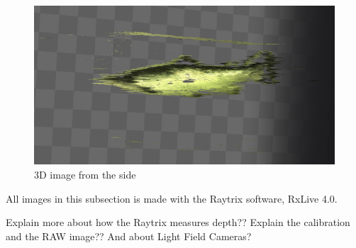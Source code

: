 \begin{figure}[h]
    \centering
    \includegraphics[width=.9\linewidth]{images/introduction/depth3D_side}
    \caption{3D image from the side}
    \label{fig:3d_image_side}
\end{figure}


All images in this subsection is made with the Raytrix software, RxLive 4.0.


{\color{red}Explain more about how the Raytrix measures depth?? Explain the calibration and the RAW image?? And about Light Field Cameras?}
